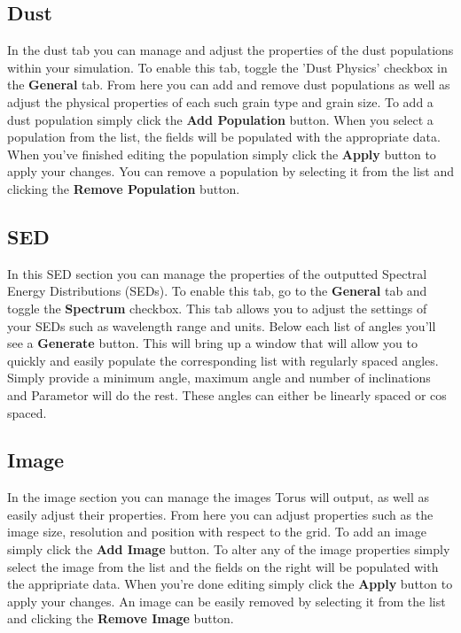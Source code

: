 \documentclass[a4paper,10pt]{article}
\begin{document}
\subsection{Dust}
In the dust tab you can manage and adjust the properties of the dust populations within your simulation. To enable this tab, toggle the 'Dust Physics' checkbox in the  \textbf{General} tab. From here you can add and remove dust populations as well as adjust the physical properties of each such grain type and grain size. To add a dust population simply click the \textbf{Add Population} button. When you select a population from the list, the fields will be populated with the appropriate data. When you've finished editing the population simply click the \textbf{Apply} button to apply your changes. You can remove a population by selecting it from the list and clicking the \textbf{Remove Population} button.

\subsection{SED}
In this SED section you can manage the properties of the outputted Spectral Energy Distributions (SEDs). To enable this tab, go to the \textbf{General} tab and toggle the \textbf{Spectrum} checkbox. This tab allows you to adjust the settings of your SEDs such as wavelength range and units. Below each list of angles you'll see a \textbf{Generate} button. This will bring up a window that will allow you to quickly and easily populate the corresponding list with regularly spaced angles. Simply provide a minimum angle, maximum angle and number of inclinations and Parametor will do the rest. These angles can either be linearly spaced or cos spaced.

\subsection{Image}
In the image section you can manage the images Torus will output, as well as easily adjust their properties. From here you can adjust properties such as the image size, resolution and position with respect to the grid. To add an image simply click the \textbf{Add Image} button. To alter any of the image properties simply select the image from the list and the fields on the right will be populated with the appripriate data. When you're done editing simply click the  \textbf{Apply} button to apply your changes. An image can be easily removed by selecting it from the list and clicking the \textbf{Remove Image} button. 
\end{document}
